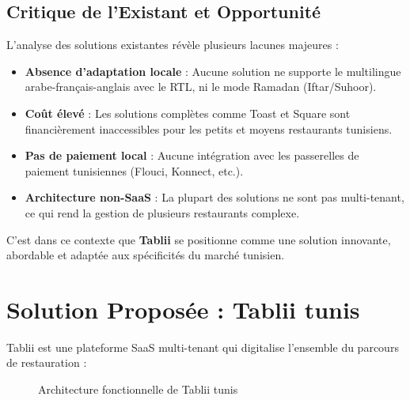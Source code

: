 \documentclass[12pt,a4paper]{report}
\begin{document}
\subsection{Critique de l'Existant et Opportunité}

L'analyse des solutions existantes révèle plusieurs lacunes majeures :

\begin{itemize}[leftmargin=1.5cm, itemsep=0.3cm]
    \item \textbf{Absence d'adaptation locale} : Aucune solution ne supporte le multilingue arabe-français-anglais avec le RTL, ni le mode Ramadan (Iftar/Suhoor).
    \item \textbf{Coût élevé} : Les solutions complètes comme Toast et Square sont financièrement inaccessibles pour les petits et moyens restaurants tunisiens.
    \item \textbf{Pas de paiement local} : Aucune intégration avec les passerelles de paiement tunisiennes (Flouci, Konnect, etc.).
    \item \textbf{Architecture non-SaaS} : La plupart des solutions ne sont pas multi-tenant, ce qui rend la gestion de plusieurs restaurants complexe.
\end{itemize}

C'est dans ce contexte que \textbf{Tablii} se positionne comme une solution innovante, abordable et adaptée aux spécificités du marché tunisien.

\section{Solution Proposée : Tablii tunis}

Tablii est une plateforme SaaS multi-tenant qui digitalise l'ensemble du parcours de restauration :

\begin{figure}[H]
    \centering
    \caption{Architecture fonctionnelle de Tablii tunis}
    \label{fig:functional-arch}
\end{figure}
\end{document}
